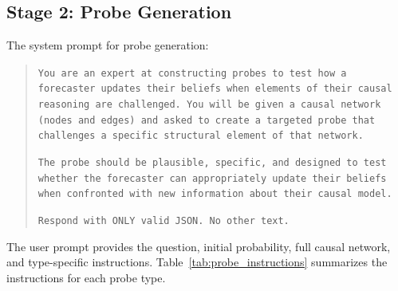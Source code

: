 \documentclass[11pt]{article}
\begin{document}
\subsection{Stage 2: Probe Generation}
\label{app:prompt-probe-gen}

The system prompt for probe generation:

\begin{quote}
\small
\texttt{You are an expert at constructing probes to test how a forecaster updates their beliefs when elements of their causal reasoning are challenged. You will be given a causal network (nodes and edges) and asked to create a targeted probe that challenges a specific structural element of that network.}

\texttt{The probe should be plausible, specific, and designed to test whether the forecaster can appropriately update their beliefs when confronted with new information about their causal model.}

\texttt{Respond with ONLY valid JSON. No other text.}
\end{quote}

The user prompt provides the question, initial probability, full causal network, and type-specific instructions. Table~\ref{tab:probe_instructions} summarizes the instructions for each probe type.
\end{document}

